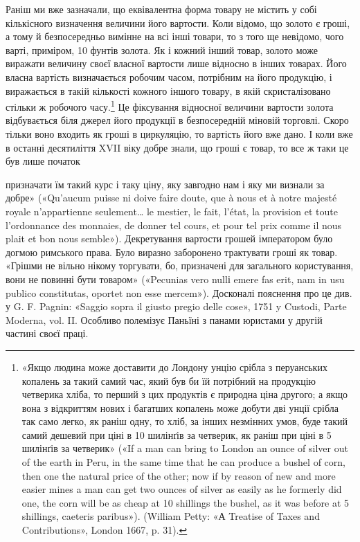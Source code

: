 Раніш ми вже зазначали, що еквівалентна форма товару не
містить у собі кількісного визначення величини його вартости.
Коли відомо, що золото є гроші, а тому й безпосередньо вимінне
на всі інші товари, то з того ще невідомо, чого варті, приміром,
10 фунтів золота. Як і кожний інший товар, золото може виражати
величину своєї власної вартости лише відносно в інших товарах.
Його власна вартість визначається робочим часом, потрібним
на його продукцію, і виражається в такій кількості кожного
іншого товару, в якій скристалізовано стільки ж робочого часу.\footnote{
«Якщо людина може доставити до Лондону унцію срібла з перуанських
копалень за такий самий час, який був би їй потрібний на продукцію
четверика хліба, то перший з цих продуктів є природна ціна другого;
а якщо вона з відкриттям нових і багатших копалень може добути дві
унції срібла так само легко, як раніш одну, то хліб, за інших незмінних
умов, буде такий самий дешевий при ціні в 10 шилінґів за четверик, як
раніш при ціні в 5 шилінґів за четверик» («If a man can bring to London
an ounce of silver out of the earth in Peru, in the same time that he can
produce a bushel of corn, then one the natural price of the other; now if
by reason of new and more easier mines a man can get two ounces of silver
as easily as he formerly did one, the corn will be as cheap at 10 shillings
the bushel, as it was before at 5 shillings, caeteris paribus»). (William
Petty: «А Treatise of Taxes and Contributions», London 1667, p. 31).
}
Це фіксування відносної величини вартости золота відбувається
біля джерел його продукції в безпосередній міновій торговлі.
Скоро тільки воно входить як гроші в циркуляцію, то вартість
його вже дано. І коли вже в останні десятиліття XVII віку
добре знали, що гроші є товар, то все ж таки це був лише початок

призначати їм такий курс і таку ціну, яку завгодно нам і яку ми визнали
за добре» («Qu’aucum puisse ni doive faire doute, que à nous et à notre
majesté royale n’appartienne seulement\dots{} le mestier, le fait, l’état, la provision
et toute l’ordonnance des monnaies, de donner tel cours, et pour tel
prix comme il nous plait et bon nous semble»). Декретування вартости
грошей імператором було догмою римського права. Було виразно заборонено
трактувати гроші як товар. «Грішми не вільно нікому торгувати,
бо, призначені для загального користування, вони не повинні бути товаром»
(«Pecunias vero nullі emere fas erit, nam in usu publico constitutas,
oportet non esse mercem»). Досконалі пояснення про це див. у G. F. Pagnin:
«Saggio sopra il giusto pregio delle cose», 1751 y Custodi, Parte
Moderna, vol. II. Особливо полемізує Паньїні з панами юристами у другій
частині своєї праці.
\parbreak{}  %
